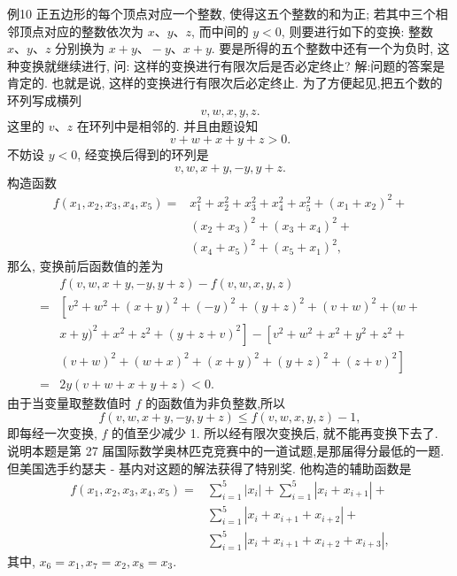 例10 正五边形的每个顶点对应一个整数, 使得这五个整数的和为正; 若其中三个相邻顶点对应的整数依次为 $x 、 y 、 z$, 而中间的 $y<0$, 则要进行如下的变换: 整数 $x 、 y 、 z$ 分别换为 $x+y 、-y 、 x+y$. 要是所得的五个整数中还有一个为负时, 这种变换就继续进行, 问: 这样的变换进行有限次后是否必定终止?
解:问题的答案是肯定的.
也就是说, 这样的变换进行有限次后必定终止.
为了方便起见,把五个数的环列写成横列
$$
v, w, x, y, z .
$$
这里的 $v 、 z$ 在环列中是相邻的.
并且由题设知
$$
v+w+x+y+z>0 .
$$
不妨设 $y<0$, 经变换后得到的环列是
$$
v, w, x+y,-y, y+z .
$$
构造函数
$$
\begin{aligned}
f\left(x_1, x_2, x_3, x_4, x_5\right)= & x_1^2+x_2^2+x_3^2+x_4^2+x_5^2+\left(x_1+x_2\right)^2+ \\
& \left(x_2+x_3\right)^2+\left(x_3+x_4\right)^2+ \\
& \left(x_4+x_5\right)^2+\left(x_5+x_1\right)^2,
\end{aligned}
$$
那么, 变换前后函数值的差为
$$
\begin{aligned}
& f(v, w, x+y,-y, y+z)-f(v, w, x, y, z) \\
= & {\left[v^2+w^2+(x+y)^2+(-y)^2+(y+z)^2+(v+w)^2+(w+\right.} \\
& \left.x+y)^2+x^2+z^2+(y+z+v)^2\right]-\left[v^2+w^2+x^2+y^2+z^2+\right. \\
& \left.(v+w)^2+(w+x)^2+(x+y)^2+(y+z)^2+(z+v)^2\right] \\
= & 2 y(v+w+x+y+z)<0 .
\end{aligned}
$$
由于当变量取整数值时 $f$ 的函数值为非负整数,所以
$$
f(v, w, x+y,-y, y+z) \leqslant f(v, w, x, y, z)-1,
$$
即每经一次变换, $f$ 的值至少减少 1. 所以经有限次变换后, 就不能再变换下去了.
说明本题是第 27 届国际数学奥林匹克竞赛中的一道试题,是那届得分最低的一题.
但美国选手约瑟夫 - 基内对这题的解法获得了特别奖.
他构造的辅助函数是
$$
\begin{aligned}
f\left(x_1, x_2, x_3, x_4, x_5\right)= & \sum_{i=1}^5\left|x_i\right|+\sum_{i=1}^5\left|x_i+x_{i+1}\right|+ \\
& \sum_{i=1}^5\left|x_i+x_{i+1}+x_{i+2}\right|+ \\
& \sum_{i=1}^5\left|x_i+x_{i+1}+x_{i+2}+x_{i+3}\right|,
\end{aligned}
$$
其中, $x_6=x_1, x_7=x_2, x_8=x_3$.



